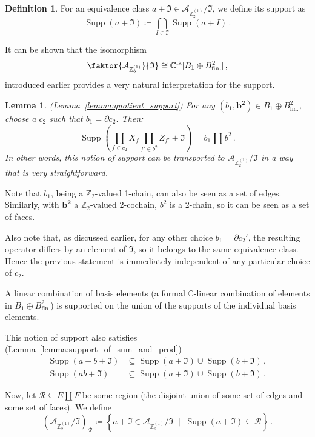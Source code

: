 \documentclass[aps,twocolumn,prx,floatfix,preprintnumbers, nofootinbib,10pt]{revtex4-2}
\numberwithin{equation}{section}
\newtheorem{lemma}[theorem]{Lemma}
\theoremstyle{definition}
\newtheorem{definition}[theorem]{Definition}
\theoremstyle{remark}
\theoremstyle{claim}
\newcommand{\be}{\begin{equation}}
\newcommand{\ee}{\end{equation}}
\newcommand{\lbbb}{\left\{}
\newcommand{\rbbb}{\right\}}
\newcommand{\Z}{{\mathbb Z}}
\newcommand{\mc}[1]{\mathcal{#1}}
\newcommand{\paren}[1]{\left( #1 \right)}
\begin{document}
\begin{definition}
 For an equivalence class $a + \mathfrak{I} \in \mathcal{A}_{\Z_2^{(1)}} / \mathfrak{I}$, we define its support as
 \be
 \operatorname{Supp}(a + \mathfrak{I}) \coloneqq \bigcap_{I \in \mathfrak{I}} \operatorname{Supp}(a + I) \,.
 \ee
\end{definition}

It can be shown that the isomorphism
\be
\faktor{\mathcal{A}_{\Z_2^{(1)}}}{\mathfrak{I}} \cong \mathbb{C}^{\text{lk}}[B_1 \oplus B^2_\text{fin.}] \,,
\ee
introduced earlier provides a very natural interpretation for the support.
\begin{lemma}
 (Lemma~\ref{lemma:quotient_support}) For any $(b_1, \bm{b^2}) \in B_1 \oplus B^2_\text{fin.}$, choose a $c_2$ such that $b_1 = \partial c_2$. Then:
 \be
 \operatorname{Supp}\paren{\prod_{f \in c_2} X_f \prod_{f' \in b^2} Z_{f'} + \mathfrak{I}} = b_1 \coprod b^2 \,.
 \ee
 In other words, this notion of support can be transported to $\mathcal{A}_{\Z_2^{(1)}} / \mathfrak{I}$ in a way that is very straightforward.
\end{lemma}

Note that $b_1$, being a $\Z_2$-valued 1-chain, can also be seen as a set of edges. Similarly, with $\bm{b^2}$ a $\Z_2$-valued 2-cochain, $b^2$ is a 2-chain, so it can be seen as a set of faces.

Also note that, as discussed earlier, for any other choice $b_1 = \partial c_2'$, the resulting operator differs by an element of $\mathfrak{I}$, so it belongs to the same equivalence class. Hence the previous statement is immediately independent of any particular choice of $c_2$.

A linear combination of basis elements (a formal $\mathbb{C}$-linear combination of elements in $B_1 \oplus B^2_\text{fin.}$) is supported on the union of the supports of the individual basis elements.

This notion of support also satisfies (Lemma~\ref{lemma:support_of_sum_and_prod})
\begin{align}
\operatorname{Supp}(a + b + \mathfrak{I}) &\subseteq \operatorname{Supp}(a + \mathfrak{I}) \cup \operatorname{Supp}(b + \mathfrak{I}) \,, \\
\operatorname{Supp}(ab + \mathfrak{I}) &\subseteq \operatorname{Supp}(a + \mathfrak{I}) \cup \operatorname{Supp}(b + \mathfrak{I}) \,.
\end{align}

Now, let $\mathcal{R} \subseteq E \coprod F$ be some region (the disjoint union of some set of edges and some set of faces). We define
\be\label{eq:localized_subalgebra}
\paren{\mc{A}_{\Z_2^{(1)}} / \mathfrak{I}}_\mathcal{R} \coloneqq \lbbb a + \mathfrak{I} \in \mc{A}_{\Z_2^{(1)}} / \mathfrak{I} \; \mid \; \operatorname{Supp}(a + \mathfrak{I}) \subseteq \mathcal{R} \rbbb \,.
\ee
\end{document}
